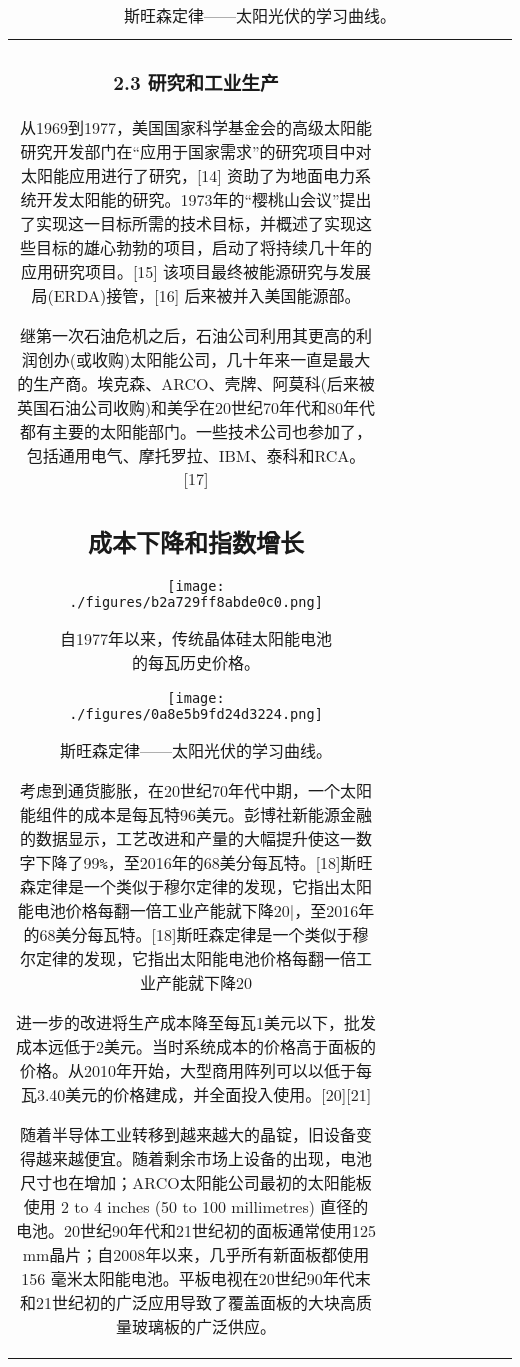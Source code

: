 \begin{table}[ht]
\begin{tabular}{|c|c|c|c|c|c|c|c|c}
\subsubsection{2.3 研究和工业生产}

从1969到1977，美国国家科学基金会的高级太阳能研究开发部门在“应用于国家需求”的研究项目中对太阳能应用进行了研究，[14] 资助了为地面电力系统开发太阳能的研究。1973年的“樱桃山会议”提出了实现这一目标所需的技术目标，并概述了实现这些目标的雄心勃勃的项目，启动了将持续几十年的应用研究项目。[15] 该项目最终被能源研究与发展局(ERDA)接管，[16] 后来被并入美国能源部。

继第一次石油危机之后，石油公司利用其更高的利润创办(或收购)太阳能公司，几十年来一直是最大的生产商。埃克森、ARCO、壳牌、阿莫科(后来被英国石油公司收购)和美孚在20世纪70年代和80年代都有主要的太阳能部门。一些技术公司也参加了，包括通用电气、摩托罗拉、IBM、泰科和RCA。[17]

\subsection{成本下降和指数增长}

\begin{figure}[ht]
\centering
\texttt{[image: ./figures/b2a729ff8abde0c0.png]}
\caption{自1977年以来，传统晶体硅太阳能电池的每瓦历史价格。} \label{fig_TYNDC_12}
\end{figure}

\begin{figure}[ht]
\centering
\texttt{[image: ./figures/0a8e5b9fd24d3224.png]}
\caption{斯旺森定律——太阳光伏的学习曲线。} \label{fig_TYNDC_13}
\end{figure}

考虑到通货膨胀，在20世纪70年代中期，一个太阳能组件的成本是每瓦特96美元。彭博社新能源金融的数据显示，工艺改进和产量的大幅提升使这一数字下降了99\verb|%|，至2016年的68美分每瓦特。[18]斯旺森定律是一个类似于穆尔定律的发现，它指出太阳能电池价格每翻一倍工业产能就下降20%

进一步的改进将生产成本降至每瓦1美元以下，批发成本远低于2美元。当时系统成本的价格高于面板的价格。从2010年开始，大型商用阵列可以以低于每瓦3.40美元的价格建成，并全面投入使用。[20][21]

随着半导体工业转移到越来越大的晶锭，旧设备变得越来越便宜。随着剩余市场上设备的出现，电池尺寸也在增加；ARCO太阳能公司最初的太阳能板使用 2 to 4 inches (50 to 100 millimetres) 直径的电池。20世纪90年代和21世纪初的面板通常使用125 mm晶片；自2008年以来，几乎所有新面板都使用156 毫米太阳能电池。平板电视在20世纪90年代末和21世纪初的广泛应用导致了覆盖面板的大块高质量玻璃板的广泛供应。


\end{tabular}
\end{table}

